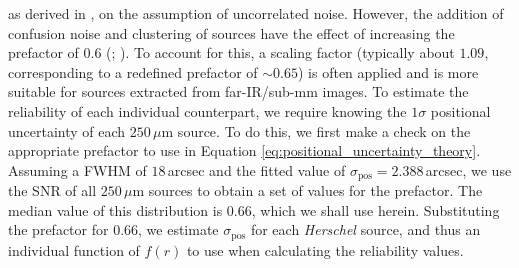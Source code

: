 \noindent as derived in \citealt{Ivison_2007}, on the assumption of uncorrelated noise. However, the addition of confusion noise and clustering of sources have the effect of increasing the prefactor of $0.6$ (\citealt{Chapin_2011}; \citealt{Bourne_2014}). To account for this, a scaling factor (typically about $1.09$, corresponding to a redefined prefactor of $\sim 0.65$) is often applied and is more suitable for sources extracted from far-IR/sub-mm images. To estimate the reliability of each individual counterpart, we require knowing the $1\sigma$ positional uncertainty of each $250\,\mu$m source. To do this, we first make a check on the appropriate prefactor to use in Equation \ref{eq:positional_uncertainty_theory}. Assuming a FWHM of $18\,$arcsec and the fitted value of $\sigma_{\textrm{pos}} = 2.388\,$arcsec, we use the SNR of all $250\,\mu$m sources to obtain a set of values for the prefactor. The median value of this distribution is $0.66$, which we shall use herein. Substituting the prefactor for $0.66$, we estimate $\sigma_{\textrm{pos}}$ for each \textit{Herschel} source, and thus an individual function of $f(r)$ to use when calculating the reliability values.

